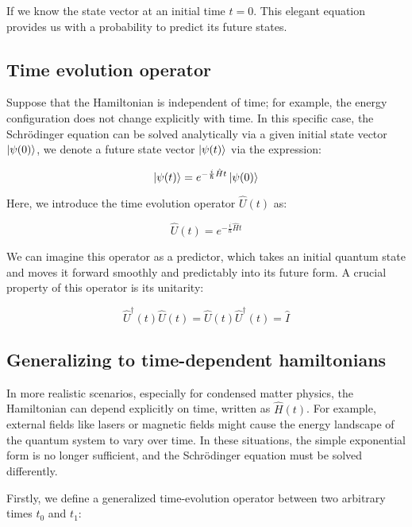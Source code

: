 If we know the state vector at an initial time $t=0$. This elegant equation provides us with a probability to predict its future states.

\subsection{Time evolution operator}

Suppose that the Hamiltonian is independent of time; for example, the energy configuration does not change explicitly with time. In this specific case, the Schrödinger equation can be solved analytically via a given initial state vector $\ket{\psi(0)}$, we denote a future state vector $\ket{\psi(t)}$ via the expression:

\begin{equation}
    \ket{\psi(t)}=e^{-\frac{i}{\hbar}\hat{H}t}\ket{\psi(0)}
    \label{state_vec}
\end{equation}

Here, we introduce the time evolution operator $\hat{U}(t)$ as:

\begin{equation}
    \hat{U}(t) = e^{-\frac{i}{\hbar}\hat{H}t}
    \label{evolution_ope}
\end{equation}

We can imagine this operator as a predictor, which takes an initial quantum state and moves it forward smoothly and predictably into its future form. A crucial property of this operator is its unitarity:

\begin{equation}
    \hat{U}^\dagger(t)\hat{U}(t)=\hat{U}(t)\hat{U}^\dagger(t) = \hat{I}
    \label{evolution_unitarity}
\end{equation}

\subsection{Generalizing to time-dependent hamiltonians}

In more realistic scenarios, especially for condensed matter physics, the Hamiltonian can depend explicitly on time, written as $\hat{H}(t)$.
For example, external fields like lasers or magnetic fields might cause the energy landscape of the quantum system to vary over time. In these situations, the simple exponential form is no longer sufficient, and the Schrödinger equation must be solved differently.

Firstly, we define a generalized time-evolution operator between two arbitrary times $t_0$ and $t_1$:

